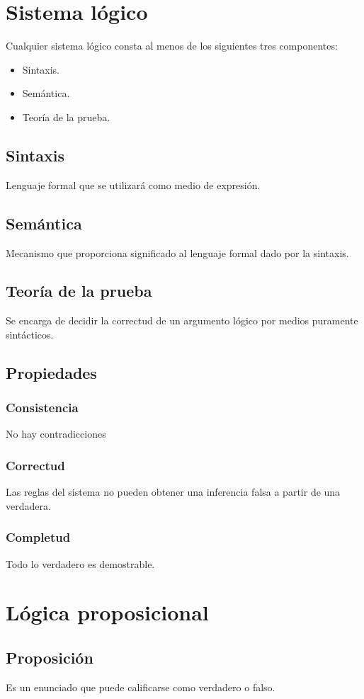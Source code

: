 \documentclass[a4paper]{article}
\begin{document}
\section{Sistema lógico}
\noindent
Cualquier sistema lógico consta al menos de los siguientes tres componentes:
\begin{itemize}
    \item Sintaxis.
    \item Semántica.
    \item Teoría de la prueba.
\end{itemize}
\subsection{Sintaxis}
\noindent
Lenguaje formal que se utilizará como medio de expresión.
\subsection{Semántica}
\noindent
Mecanismo que proporciona significado al lenguaje formal dado por la sintaxis.
\subsection{Teoría de la prueba}
\noindent
Se encarga de decidir la correctud de un argumento lógico por medios puramente sintácticos.
\subsection{Propiedades}
\subsubsection{Consistencia}
\noindent
No hay contradicciones
\subsubsection{Correctud}
\noindent
Las reglas del sistema no pueden obtener una inferencia falsa a partir de una verdadera.
\subsubsection{Completud}
\noindent
Todo lo verdadero es demostrable.
\section{Lógica proposicional}
\subsection{Proposición}
\noindent
Es un enunciado que puede calificarse como verdadero o falso.
\end{document}
